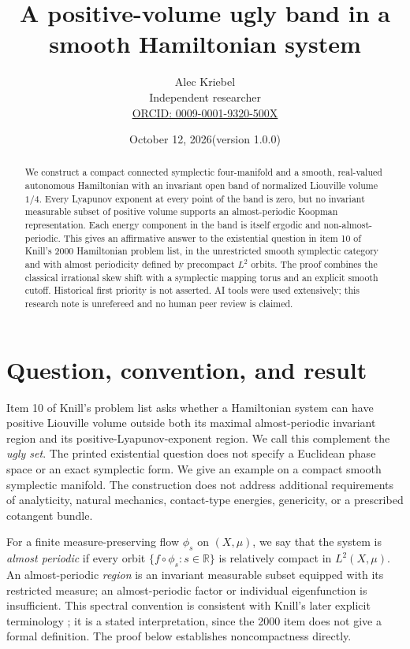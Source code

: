 \documentclass[11pt]{article}
\title{A positive-volume ugly band in a smooth Hamiltonian system}
\author{Alec Kriebel\\\small Independent researcher\\
\small\href{https://orcid.org/0009-0001-9320-500X}{ORCID: 0009-0001-9320-500X}}
\date{October 12, 2026\quad(version 1.0.0)}
\newcommand{\R}{\mathbb R}
\begin{document}
\maketitle
\begin{abstract}
We construct a compact connected symplectic four-manifold and a smooth,
real-valued autonomous Hamiltonian with an invariant open band of normalized
Liouville volume $1/4$. Every Lyapunov exponent at every point of the band is
zero, but no invariant measurable subset of positive volume supports an
almost-periodic Koopman representation. Each energy component in the band
is itself ergodic and non-almost-periodic. This gives an affirmative answer to
the existential question in item 10 of Knill's 2000 Hamiltonian problem list,
in the unrestricted smooth symplectic category and with almost periodicity
defined by precompact $L^2$ orbits. The proof combines the classical irrational
skew shift with a symplectic mapping torus and an explicit smooth cutoff.
Historical first priority is not asserted. AI tools were used extensively;
this research note is unrefereed and no human peer review is claimed.
\end{abstract}

\section{Question, convention, and result}

Item 10 of Knill's problem list \cite{knill2000} asks whether a Hamiltonian
system can have positive Liouville volume outside both its maximal
almost-periodic invariant region and its positive-Lyapunov-exponent region.
We call this complement the \emph{ugly set}. The printed existential question
does not specify a Euclidean phase space or an exact symplectic form.
We give an example on a compact smooth symplectic manifold. The construction
does not address additional requirements of analyticity, natural mechanics,
contact-type energies, genericity, or a prescribed cotangent bundle.

For a finite measure-preserving flow $\phi_s$ on $(X,\mu)$, we say that
the system is \emph{almost periodic} if every orbit
$\{f\circ\phi_s:s\in\R\}$ is relatively compact in $L^2(X,\mu)$.
An almost-periodic \emph{region} is an invariant measurable subset equipped
with its restricted measure; an almost-periodic factor or individual
eigenfunction is insufficient. This spectral convention is consistent with
Knill's later explicit terminology \cite[Section 4]{knill2016}; it is a stated
interpretation, since the 2000 item does not give a formal definition.
The proof below establishes noncompactness directly.
\end{document}
